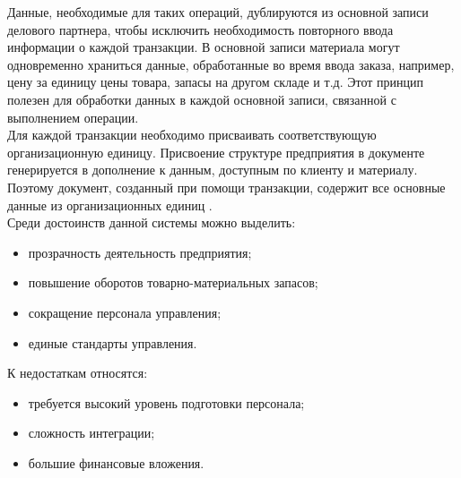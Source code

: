 Данные, необходимые для таких операций, дублируются из основной записи делового партнера, чтобы исключить необходимость повторного ввода информации о каждой транзакции. 
В основной записи материала могут одновременно храниться данные, обработанные во время ввода заказа, например, цену за единицу цены товара, запасы на другом складе и т.д. 
Этот принцип полезен для обработки данных в каждой основной записи, связанной с выполнением операции.\\
\indent Для каждой транзакции необходимо присваивать соответствующую организационную единицу. 
Присвоение структуре предприятия в документе генерируется в дополнение к данным, доступным по клиенту и материалу. 
Поэтому документ, созданный при помощи транзакции, содержит все основные данные из организационных единиц \cite{gehBook}.\\
\indent Среди достоинств данной системы можно выделить:

\begin{itemize}
	\item прозрачность деятельность предприятия;
	\item повышение оборотов товарно-материальных запасов;
	\item сокращение персонала управления;
	\item единые стандарты управления.
\end{itemize}

\indent К недостаткам относятся:

\begin{itemize}
	\item требуется высокий уровень подготовки персонала;
	\item сложность интеграции;
	\item большие финансовые вложения.
\end{itemize}
